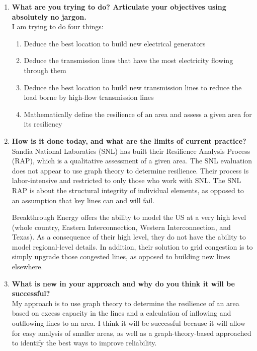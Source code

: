 \documentclass{article}
\begin{document}
\begin{enumerate}
  \item
  \textbf{What are you trying to do? Articulate your objectives using absolutely
  no jargon.} \\

  I am trying to do four things:
  \begin{enumerate}
    \item Deduce the best location to build new electrical generators
    \item Deduce the transmission lines that have the most electricity flowing
    through them
    \item Deduce the best location to build new transmission lines to reduce the
    load borne by high-flow transmission lines
    \item Mathematically define the resilience of an area and assess a given
    area for its resiliency
  \end{enumerate}

  \item
  \textbf{How is it done today, and what are the limits of current practice?} \\
  Sandia National Laboraties (SNL) has built their Resilience Analysis Process
  (RAP), which is a qualitative assessment of a given area. The SNL evaluation
  does not appear to use graph theory to determine resilience. Their process is
  labor-intensive and restricted to only those who work with SNL. The SNL RAP is
  about the structural integrity of individual elements, as opposed to an
  assumption that key lines can and will fail.

  Breakthrough Energy offers the ability to model the US at a very high level
  (whole country, Eastern Interconnection, Western Interconnection, and Texas).
  As a consequence of their high level, they do not have the ability to model
  regional-level details. In addition, their solution to grid congestion is to
  simply upgrade those congested lines, as opposed to building new lines
  elsewhere.

  \item
  \textbf{What is new in your approach and why do you think it will be
  successful?} \\
  My approach is to use graph theory to determine the resilience of an area
  based on excess capacity in the lines and a calculation of inflowing and
  outflowing lines to an area. I think it will be successful because it will
  allow for easy analysis of smaller areas, as well as a graph-theory-based
  approached to identify the best ways to improve reliability.


\end{enumerate}
\end{document}
